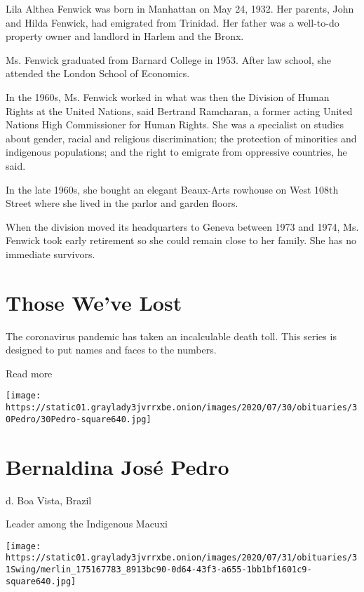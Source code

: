 Lila Althea Fenwick was born in Manhattan on May 24, 1932. Her parents,
John and Hilda Fenwick, had emigrated from Trinidad. Her father was a
well-to-do property owner and landlord in Harlem and the Bronx.

Ms. Fenwick graduated from Barnard College in 1953. After law school,
she attended the London School of Economics.

In the 1960s, Ms. Fenwick worked in what was then the Division of Human
Rights at the United Nations, said Bertrand Ramcharan, a former acting
United Nations High Commissioner for Human Rights. She was a specialist
on studies about gender, racial and religious discrimination; the
protection of minorities and indigenous populations; and the right to
emigrate from oppressive countries, he said.

In the late 1960s, she bought an elegant Beaux-Arts rowhouse on West
108th Street where she lived in the parlor and garden floors.

When the division moved its headquarters to Geneva between 1973 and
1974, Ms. Fenwick took early retirement so she could remain close to her
family. She has no immediate survivors.

\href{https://www.nytimes3xbfgragh.onion/interactive/2020/obituaries/people-died-coronavirus-obituaries.html?action=click\&pgtype=Article\&state=default\&region=BELOW_MAIN_CONTENT\&context=covid_obits_promo}{}

\hypertarget{those-weve-lost}{%
\section{Those We've Lost}\label{those-weve-lost}}

The coronavirus pandemic has taken an incalculable death toll. This
series is designed to put names and faces to the numbers.

Read more

\texttt{[image: https://static01.graylady3jvrrxbe.onion/images/2020/07/30/obituaries/30Pedro/30Pedro-square640.jpg]}

\hypertarget{bernaldina-josuxe9-pedro}{%
\section{Bernaldina José Pedro}\label{bernaldina-josuxe9-pedro}}

d. Boa Vista, Brazil

Leader among the Indigenous Macuxi

\texttt{[image: https://static01.graylady3jvrrxbe.onion/images/2020/07/31/obituaries/31Swing/merlin\_175167783\_8913bc90-0d64-43f3-a655-1bb1bf1601c9-square640.jpg]}

